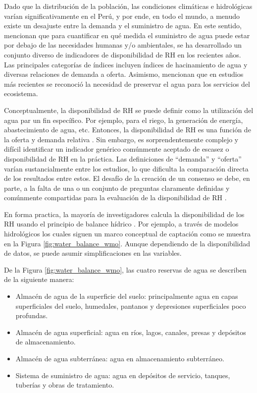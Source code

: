 \documentclass[12pt]{article}
\begin{document}
Dado que la distribución de la población, las condiciones climáticas e hidrológicas varían significativamente en el Perú, y por ende, en todo el mundo, a menudo existe un desajuste entre la demanda y el suministro de agua. En este sentido, \citet{xu2017water} mencionan que para cuantificar en qué medida el suministro de agua puede estar por debajo de las necesidades humanas y/o ambientales, se ha desarrollado un conjunto diverso de indicadores de disponibilidad de RH en los recientes años. Las principales categorías de índices incluyen índices de hacinamiento de agua y diversas relaciones de demanda a oferta. Asimismo, mencionan que en estudios más recientes se reconoció la necesidad de preservar el agua para los servicios del ecosistema.

Conceptualmente, la disponibilidad de RH se puede definir como la utilización del agua par un fin específico. Por ejemplo, para el riego, la generación de energía, abastecimiento de agua, etc. Entonces, la disponibilidad de RH es una función de la oferta y demanda relativa \citep{averyt2013sectoral}. Sin embargo, es sorprendentemente complejo y difícil identificar un indicador genérico comúnmente aceptado de escasez o disponibilidad de RH en la práctica. Las definiciones de “demanda” y “oferta” varían sustancialmente entre los estudios, lo que dificulta la comparación directa de los resultados entre estos. El desafío de la creación de un consenso se debe, en parte, a la falta de una o un conjunto de preguntas claramente definidas y comúnmente compartidas para la evaluación de la disponibilidad de RH \citep{xu2017water}.

\clearpage

\clearpage

En forma practica, la mayoría de investigadores calcula la disponibilidad de los RH usando el principio de balance hídrico \citep{WMO2012,PNRH2013,juniati2018proposing}. Por ejemplo, a través de modelos hidrológicos los cuales siguen un marco conceptual de captación como se muestra en la Figura \ref{fig:water_balance_wmo}. Aunque dependiendo de la disponibilidad de datos, se puede asumir simplificaciones en las variables.

De la Figura \ref{fig:water_balance_wmo}, las cuatro reservas de agua se describen de la siguiente manera:

\begin{itemize}
    \item Almacén de agua de la superficie del suelo: principalmente agua en capas superficiales del suelo, humedales, pantanos y depresiones superficiales poco profundas.
    
    \item Almacén de agua superficial: agua en ríos, lagos, canales, presas y depósitos de almacenamiento.
    
    \item Almacén de agua subterránea: agua en almacenamiento subterráneo.
    
    \item Sistema de suministro de agua: agua en depósitos de servicio, tanques, tuberías y obras de tratamiento.
    
\end{itemize}
\end{document}
